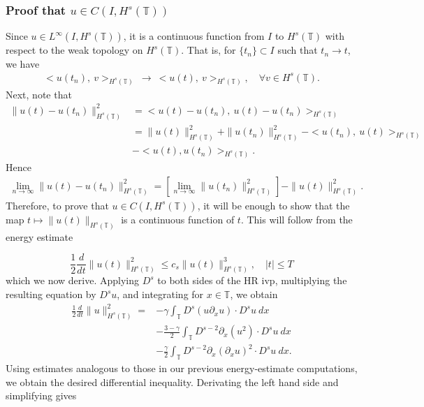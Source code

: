 \documentclass{beamer}
\newcommand{\p}{\partial}
\newcommand{\ci}{\mathbb{T}}
\begin{document}
\begin{frame}
	\frametitle{\bf Proof that $u \in C(I, H^s(\ci))$}
Since $u \in L^\infty(I, 
H^s(\ci))$, it is a
continuous function from $I$ to $H^s(\ci)$ with respect to the weak
topology on $H^s(\ci)$. That is, for $\{t_n\} \subset I$ such that $t_n \to t$, we
have
%
%
\begin{equation*}
\begin{split}
<u(t_n), \ v>_{H^s(\ci)} \ \longrightarrow \
<u(t), \ v>_{H^s(\ci)}, \quad \forall
v \in H^s(\ci).
\label{1ff}
\end{split}
\end{equation*}
%
%
Next, note that
%
%
\begin{equation*}
\begin{split}
 \|u(t) - u(t_n) \|_{H^s(\ci)}^2
& = <u(t) - u(t_n), \ u(t) -
u(t_n)>_{H^s(\ci)}
\\
& = \|u(t)\|_{H^s(\ci)}^2 + \|u(t_n)\|_{H^s(\ci)}^2
 - <u(t_n), \
u(t) >_{H^s(\ci)} 
\\
& - <u(t), u(t_n)>_{H^s(\ci)}.
\label{2ff}
\end{split}
\end{equation*}
%
%
%
%
Hence
%
%
\begin{equation*}
\begin{split}
\lim_{n \to \infty} \|u(t) - u(t_n)\|_{H^s(\ci)}^2 = \left[ \lim_{n
\to \infty} \|u(t_n)\|_{H^s(\ci)}^2
\right] - \|u(t)\|_{H^s(\ci)}^2.
\label{3ff}
\end{split}
\end{equation*}
%
%
Therefore, to prove that $u \in C(I, H^s(\ci))$, it will be
enough to show that the map $t \mapsto \|u(t)\|_{H^s(\ci)}$ is a continuous
function of $t$. This will follow from the energy
estimate

\end{frame}

\begin{frame}
%
%
\begin{equation*}
\label{en-est-u}
\frac{1}{2} \frac{d}{dt} \|u(t)\|_{H^s(\ci)}^2
\le c_s \|u(t)\|_{H^s(\ci)}^3, \quad |t| \le T
\end{equation*}
%
%
which we now derive. Applying $D^s$ to both sides of the HR ivp,
multiplying the
resulting equation by $D^s u$, and integrating for $x\in \ci$, we obtain
%
%
\begin{equation*}
\begin{split}
\label{bound-int}
 \frac 12
 \frac{d}{dt} \|u \|_{H^s(\ci)}^2
 =
& -
\gamma \int_{\ci}   D^s (u \p_x u) \cdot
D^s u \  dx
\\
& - \frac{3 -\gamma}{2} \int_{\ci}  D^{s-2} \p_x (u^2) \cdot D^s u \ dx
\\
& - \frac{\gamma}{2} \int_{\ci}   D^{s-2} \p_x (\p_x u)^2
\cdot D^s u \ dx.
\end{split}
\end{equation*}
%
%
Using estimates analogous to those in our previous energy-estimate 
computations, we 
obtain the desired differential inequality.
Derivating the left hand side and simplifying gives
%
%

\end{frame}
\end{document}
